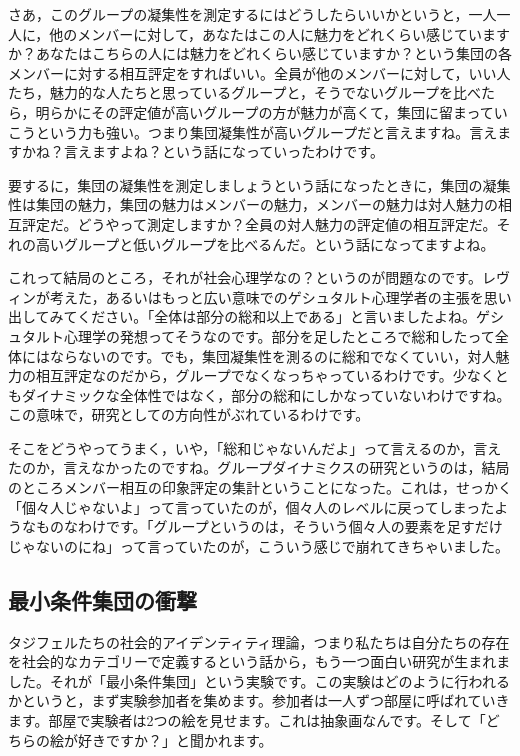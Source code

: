 \documentclass{ltjsbook}
\begin{document}
さあ，このグループの凝集性を測定するにはどうしたらいいかというと，一人一人に，他のメンバーに対して，あなたはこの人に魅力をどれくらい感じていますか？あなたはこちらの人には魅力をどれくらい感じていますか？という集団の各メンバーに対する相互評定をすればいい。全員が他のメンバーに対して，いい人たち，魅力的な人たちと思っているグループと，そうでないグループを比べたら，明らかにその評定値が高いグループの方が魅力が高くて，集団に留まっていこうという力も強い。つまり集団凝集性が高いグループだと言えますね。言えますかね？言えますよね？という話になっていったわけです。

要するに，集団の凝集性を測定しましょうという話になったときに，集団の凝集性は集団の魅力，集団の魅力はメンバーの魅力，メンバーの魅力は対人魅力の相互評定だ。どうやって測定しますか？全員の対人魅力の評定値の相互評定だ。それの高いグループと低いグループを比べるんだ。という話になってますよね。

これって結局のところ，それが社会心理学なの？というのが問題なのです。レヴィンが考えた，あるいはもっと広い意味でのゲシュタルト心理学者の主張を思い出してみてください。「全体は部分の総和以上である」と言いましたよね。ゲシュタルト心理学の発想ってそうなのです。部分を足したところで総和したって全体にはならないのです。でも，集団凝集性を測るのに総和でなくていい，対人魅力の相互評定なのだから，グループでなくなっちゃっているわけです。少なくともダイナミックな全体性ではなく，部分の総和にしかなっていないわけですね。この意味で，研究としての方向性がぶれているわけです。

そこをどうやってうまく，いや，「総和じゃないんだよ」って言えるのか，言えたのか，言えなかったのですね。グループダイナミクスの研究というのは，結局のところメンバー相互の印象評定の集計ということになった。これは，せっかく「個々人じゃないよ」って言っていたのが，個々人のレベルに戻ってしまったようなものなわけです。「グループというのは，そういう個々人の要素を足すだけじゃないのにね」って言っていたのが，こういう感じで崩れてきちゃいました。

\subsection{最小条件集団の衝撃}
タジフェルたちの社会的アイデンティティ理論，つまり私たちは自分たちの存在を社会的なカテゴリーで定義するという話から，もう一つ面白い研究が生まれました。それが「最小条件集団」という実験です。この実験はどのように行われるかというと，まず実験参加者を集めます。参加者は一人ずつ部屋に呼ばれていきます。部屋で実験者は2つの絵を見せます。これは抽象画なんです。そして「どちらの絵が好きですか？」と聞かれます。
\end{document}
